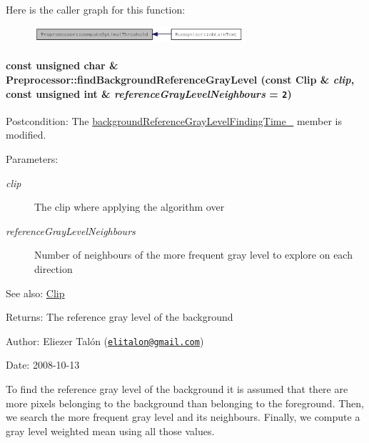 Here is the caller graph for this function:\nopagebreak
\begin{figure}[H]
\begin{center}
\leavevmode
\includegraphics[width=220pt]{class_preprocessor_ac2f414d6f4f917419f33f6067eb8634_icgraph}
\end{center}
\end{figure}
\hypertarget{class_preprocessor_a941f81382bd8e235e4dd12481342be4}{
\paragraph[{findBackgroundReferenceGrayLevel}]{\setlength{\rightskip}{0pt plus 5cm}const unsigned char \& Preprocessor::findBackgroundReferenceGrayLevel (const {\bf Clip} \& {\em clip}, \/  const unsigned int \& {\em referenceGrayLevelNeighbours} = {\tt 2})}\hfill}
\label{class_preprocessor_a941f81382bd8e235e4dd12481342be4}


\begin{Desc}
\item[Postcondition:]The \hyperlink{class_preprocessor_98ea95388e043eef5460beaf2e3aaaed}{backgroundReferenceGrayLevelFindingTime\_\-} member is modified.\end{Desc}
\begin{Desc}
\item[Parameters:]
\begin{description}
\item[{\em clip}]The clip where applying the algorithm over \item[{\em referenceGrayLevelNeighbours}]Number of neighbours of the more frequent gray level to explore on each direction\end{description}
\end{Desc}
\begin{Desc}
\item[See also:]\hyperlink{class_clip}{Clip}\end{Desc}
\begin{Desc}
\item[Returns:]The reference gray level of the background\end{Desc}
\begin{Desc}
\item[Author:]Eliezer Talón (\href{mailto:elitalon@gmail.com}{\tt elitalon@gmail.com}) \end{Desc}
\begin{Desc}
\item[Date:]2008-10-13\end{Desc}
To find the reference gray level of the background it is assumed that there are more pixels belonging to the background than belonging to the foreground. Then, we search the more frequent gray level and its neighbours. Finally, we compute a gray level weighted mean using all those values.

